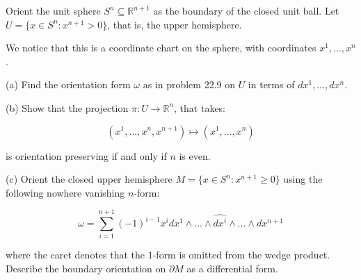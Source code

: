 \documentclass[10pt]{article}
\theoremstyle{nonumberplain}%
\newenvironment{problem}[2][]{\begin{trivlist}
\item[\hskip \labelsep {\bfseries #1}\hskip \labelsep {\bfseries #2.}]}{\end{trivlist}}
\begin{document}
\begin{problem}{Question 5}

Orient the unit sphere $S^n \subseteq \mathbb{R}^{n+1}$ as the boundary of the closed unit ball. Let $U = \{ x \in S^n : x^{n+1} > 0 \}$, that is, the upper hemisphere.

We notice that this is a coordinate chart on the sphere, with coordinates $x^1,...,x^n$. 

(a) Find the orientation form $\omega$ as in problem 22.9 on $U$ in terms of $dx^1,...,dx^n$.

(b) Show that the projection $\pi: U \to \mathbb{R}^n$, that takes:

$$ (x^1,...,x^n, x^{n+1}) \mapsto ( x^1,...,x^n) $$

is orientation preserving if and only if $n$ is even.

(c) Orient the closed upper hemisphere $M = \{ x \in S^n : x^{n+1} \geq 0 \}$ using the following nowhere vanishing $n$-form:

$$ \omega = \sum_{i=1}^{n+1} (-1)^{i-1} x^i dx^1 \wedge ... \wedge \widehat{dx^i} \wedge ... \wedge dx^{n+1} $$

where the caret denotes that the $1$-form is omitted from the wedge product. Describe the boundary orientation on $\partial M$ as a differential form.

\end{problem}
\end{document}
